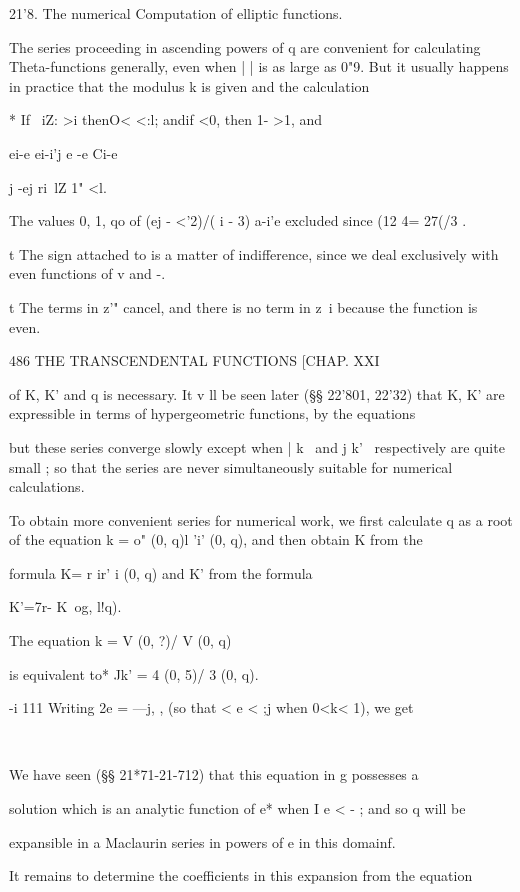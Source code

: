 21'8. The numerical Computation of elliptic functions.

The series proceeding in ascending powers of q are convenient for
calculating Theta-functions generally, even when | | is as large as
0"9. But it usually happens in practice that the modulus k is given
and the calculation

* If \ iZ: >i thenO< <:l; andif <0, then 1- >1, and

ei-e ei-i'j e -e Ci-e

 j -ej ri\ lZ 1" <l.

The values 0, 1, qo of (ej - <'2)/( i - 3) a-i'e excluded since (12 4=
27(/3 .

t The sign attached to is a matter of indifference, since we deal
exclusively with even functions of v and -.

t The terms in z'" cancel, and there is no term in z~i because the
function is even.

486 THE TRANSCENDENTAL FUNCTIONS [CHAP. XXI

of K, K' and q is necessary. It v ll be seen later (§§ 22'801, 22'32)
that K, K' are expressible in terms of hypergeometric functions, by
the equations

but these series converge slowly except when | k \ and j k' \
respectively are quite small ; so that the series are never
simultaneously suitable for numerical calculations.

To obtain more convenient series for numerical work, we first
calculate q as a root of the equation k = o" (0, q)l 'i' (0, q), and
then obtain K from the

formula K= r ir' i (0, q) and K' from the formula

K'=7r- K\ og, l!q).

The equation k = V (0, ?)/ V (0, q)

is equivalent to* Jk' = 4 (0, 5)/ 3 (0, q).

-i 111 Writing 2e = —j, , (so that < e < ;j when 0<k< 1), we get

\ %

We have seen (§§ 21*71-21-712) that this equation in g possesses a

solution which is an analytic function of e* when I e < - ; and so q
will be

expansible in a Maclaurin series in powers of e in this domainf.

It remains to determine the coefficients in this expansion from the
equation

